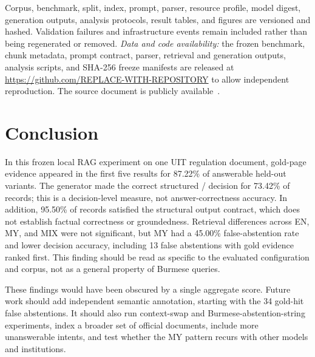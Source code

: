 \documentclass[a4paper,conference]{IEEEtran}
\newcommand{\code}[1]{\texttt{\detokenize{#1}}}
\newcommand{\repourl}{\url{https://github.com/REPLACE-WITH-REPOSITORY}}
\begin{document}
Corpus, benchmark, split, index, prompt, parser, resource profile, model digest, generation outputs, analysis protocols, result tables, and figures are versioned and hashed. Validation failures and infrastructure events remain included rather than being regenerated or removed. \emph{Data and code availability:} the frozen benchmark, chunk metadata, prompt contract, parser, retrieval and generation outputs, analysis scripts, and SHA-256 freeze manifests are released at \repourl{} to allow independent reproduction. The source document is publicly available~\cite{uit2025regulations}.

\section{Conclusion}
In this frozen local RAG experiment on one UIT regulation document, gold-page evidence appeared in the first five results for 87.22\% of answerable held-out variants. The generator made the correct structured \code{ANSWER}/\code{ABSTAIN} decision for 73.42\% of records; this is a decision-level measure, not answer-correctness accuracy. In addition, 95.50\% of records satisfied the structural output contract, which does not establish factual correctness or groundedness. Retrieval differences across EN, MY, and MIX were not significant, but MY had a 45.00\% false-abstention rate and lower decision accuracy, including 13 false abstentions with gold evidence ranked first. This finding should be read as specific to the evaluated configuration and corpus, not as a general property of Burmese queries.

These findings would have been obscured by a single aggregate score. Future work should add independent semantic annotation, starting with the 34 gold-hit false abstentions. It should also run context-swap and Burmese-abstention-string experiments, index a broader set of official documents, include more unanswerable intents, and test whether the MY pattern recurs with other models and institutions.
\end{document}
